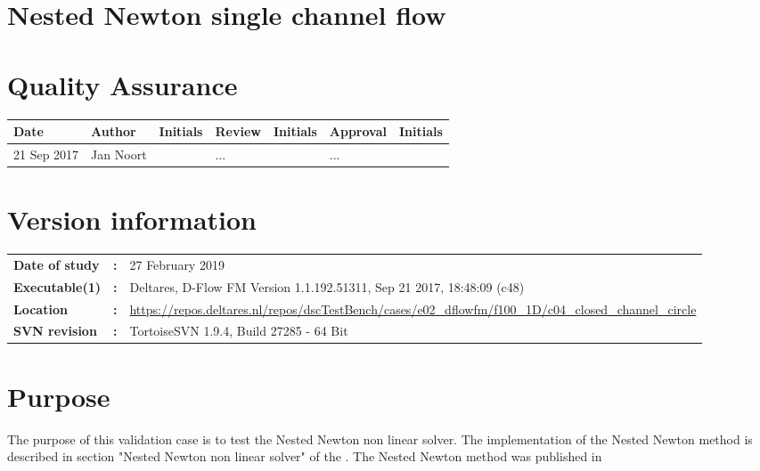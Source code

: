 \section{Nested Newton single channel flow}
\newrefsegment

\section*{Quality Assurance}
{{\footnotesize
\begin{tabular}{p{22mm-2pt}@{}p{27mm-2pt}@{}p{18mm}@{}p{27mm-2pt}@{}p{18mm}@{}p{27mm-2pt}@{}p{\textwidth-139mm-1pt}} \hline
    \rowcolor{dgrey4}
\textbf{Date} & \textbf{Author} & \textbf{Initials} & \textbf{Review} & \textbf{Initials} & \textbf{Approval} & \textbf{Initials}  \\ \hline
21 Sep 2017 & Jan Noort & & ... & & ... &   \\ \hline
  \end{tabular}
}}

\section*{Version information}
\begin{tabular}{@{}p{23mm}@{}p{0mm}p{\textwidth-23mm-30pt}}
\textbf{Date of study}    & \textbf{:} & 27 February 2019 \\
\textbf{Executable(1)}   & \textbf{:} & Deltares, D-Flow FM Version 1.1.192.51311, Sep 21 2017, 18:48:09 (c48) \\
\textbf{Location}         & \textbf{:} & \url{https://repos.deltares.nl/repos/dscTestBench/cases/e02_dflowfm/f100_1D/c04\_closed\_channel\_circle} \\ 
\textbf{SVN revision}     & \textbf{:} & TortoiseSVN 1.9.4, Build 27285 - 64 Bit
\end{tabular}

\section*{Purpose}
The purpose of this validation case is to test the Nested Newton non linear solver. 
The implementation of the Nested Newton method is described in section "Nested Newton non linear solver" of the \citet{DFLOWFM_TRM}. 
The Nested Newton method was published in \cite{Casulli2013}

